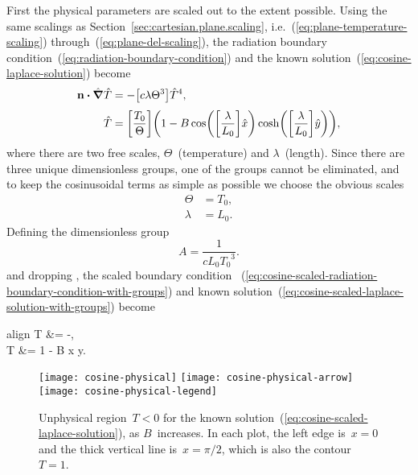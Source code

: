 First the physical parameters are scaled out to the extent possible.
Using the same scalings as Section~\ref{sec:cartesian.plane.scaling},
i.e.~(\ref{eq:plane-temperature-scaling}) through~(\ref{eq:plane-del-scaling}),
the radiation boundary condition~(\ref{eq:radiation-boundary-condition})
and the known solution~(\ref{eq:cosine-laplace-solution})
become
\begin{align}
  \normalvec \dotp \scaleddel \scaled{T}
    &= -\group{c \lambda \Theta^3} \scaled{T}^4,
    \label{eq:cosine-scaled-radiation-boundary-condition-with-groups}
    \\[\tallspace]
  \scaled{T}
    &=
      \group{\frac{T_0}{\Theta}}
      \roundbr*{
        1 -
          B
          \cos \roundbr*{\group{\frac{\lambda}{L_0}} \scaled{x}}
          \cosh \roundbr*{\group{\frac{\lambda}{L_0}} \scaled{y}}
      },
    \label{eq:cosine-scaled-laplace-solution-with-groups}
\end{align}
where there are two free scales, $\Theta$~(temperature) and $\lambda$~(length).
Since there are three unique dimensionless groups,
one of the groups cannot be eliminated,
and to keep the cosinusoidal terms as simple as possible
we choose the obvious scales
\begin{align}
  \Theta &= T_0,
    \label{eq:cosine-temperature-scale} \\
  \lambda &= L_0.
    \label{eq:cosine-length-scale}
\end{align}
Defining the dimensionless group
\begin{equation}
  A = \frac{1}{c L_0 {T_0}^3}.
  \label{eq:cosine-dimensionless-group}
\end{equation}
and dropping \scalingmarks,
the scaled boundary condition~%
  (\ref{eq:cosine-scaled-radiation-boundary-condition-with-groups})
and known solution~(\ref{eq:cosine-scaled-laplace-solution-with-groups})
become
\begin{important}{align}
  \normalvec \dotp \del T &= -,
    \label{eq:cosine-scaled-radiation-boundary-condition} \\[\tallspace]
  T &= 1 - B \cos x \cosh y.
    \label{eq:cosine-scaled-laplace-solution}
\end{important}

\begin{figure}
  \centering
  \texttt{[image: cosine-physical]}
  \texttt{[image: cosine-physical-arrow]}
  \texttt{[image: cosine-physical-legend]}
  \caption{
    Unphysical region~$T < 0$
    for the known solution~(\ref{eq:cosine-scaled-laplace-solution}),
    as $B$~increases.
    In each plot, the left edge is~$x = 0$
    and the thick vertical line is~$x = \pi/2$,
    which is also the contour~$T = 1$.
  }
  \label{fig:cosine-physical}
\end{figure}

